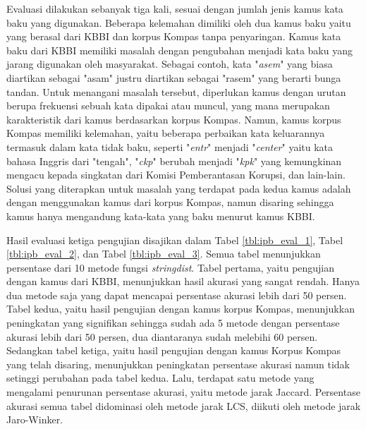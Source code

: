 Evaluasi dilakukan sebanyak tiga kali, sesuai dengan jumlah jenis kamus kata baku yang digunakan. Beberapa kelemahan dimiliki oleh dua kamus baku yaitu yang berasal dari KBBI dan korpus Kompas tanpa penyaringan. Kamus kata baku dari KBBI memiliki masalah dengan pengubahan menjadi kata baku yang jarang digunakan oleh masyarakat. Sebagai contoh, kata "\textit{asem}" yang biasa diartikan sebagai "asam" justru diartikan sebagai "rasem" yang berarti bunga tandan. Untuk menangani masalah tersebut, diperlukan kamus dengan urutan berupa frekuensi sebuah kata dipakai atau muncul, yang mana merupakan karakteristik dari kamus berdasarkan korpus Kompas. Namun, kamus korpus Kompas memiliki kelemahan, yaitu beberapa perbaikan kata keluarannya termasuk dalam kata tidak baku, seperti "\textit{entr}" menjadi "\textit{center}" yaitu kata bahasa Inggris dari "tengah", "\textit{ckp}" berubah menjadi "\textit{kpk}" yang kemungkinan mengacu kepada singkatan dari Komisi Pemberantasan Korupsi, dan lain-lain. Solusi yang diterapkan untuk masalah yang terdapat pada kedua kamus adalah dengan menggunakan kamus dari korpus Kompas, namun disaring sehingga kamus hanya mengandung kata-kata yang baku menurut kamus KBBI.

Hasil evaluasi ketiga pengujian disajikan dalam Tabel \ref{tbl:ipb_eval_1}, Tabel \ref{tbl:ipb_eval_2}, dan Tabel \ref{tbl:ipb_eval_3}. Semua tabel menunjukkan persentase dari 10 metode fungsi \textit{stringdist}. Tabel pertama, yaitu pengujian dengan kamus dari KBBI, menunjukkan hasil akurasi yang sangat rendah. Hanya dua metode saja yang dapat mencapai persentase akurasi lebih dari 50 persen. Tabel kedua, yaitu hasil pengujian dengan kamus korpus Kompas, menunjukkan peningkatan yang signifikan sehingga sudah ada 5 metode dengan persentase akurasi lebih dari 50 persen, dua diantaranya sudah melebihi 60 persen. Sedangkan tabel ketiga, yaitu hasil pengujian dengan kamus Korpus Kompas yang telah disaring, menunjukkan peningkatan persentase akurasi namun tidak setinggi perubahan pada tabel kedua. Lalu, terdapat satu metode yang mengalami penurunan persentase akurasi, yaitu metode jarak Jaccard. Persentase akurasi semua tabel didominasi oleh metode jarak LCS, diikuti oleh metode jarak Jaro-Winker.

